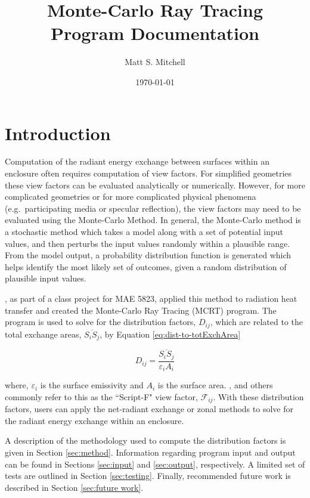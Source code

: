 \documentclass{article}
\title{\textbf{Monte-Carlo Ray Tracing} \\ Program Documentation}
\date{\today}
\author{Matt S. Mitchell}
\begin{document}
\maketitle
\clearpage
\tableofcontents
\clearpage

\section{Introduction}

Computation of the radiant energy exchange between surfaces within an enclosure often requires computation of view factors. For simplified geometries these view factors can be evaluated analytically or numerically. However, for more complicated geometries or for more complicated physical phenomena (e.g.~participating media or specular reflection), the view factors may need to be evaluated using the Monte-Carlo Method. In general, the Monte-Carlo method is a stochastic method which takes a model along with a set of potential input values, and then perturbs the input values randomly within a plausible range. From the model output, a probability distribution function is generated which helps identify the most likely set of outcomes, given a random distribution of plausible input values.

\cite{Nigusse2004}, as part of a class project for MAE 5823, applied this method to radiation heat transfer and created the Monte-Carlo Ray Tracing (MCRT) program. The program is used to solve for the distribution factors, $D_{ij}$, which are related to the total exchange areas, $\overline{S_i S_j}$, by Equation \ref{eq:dist-to-totExchArea}

\begin{equation}
    D_{ij} = \frac{\overline{S_i S_j}}{\varepsilon_i A_i}
    \label{eq:dist-to-totExchArea}
\end{equation}

where, $\varepsilon_i$ is the surface emissivity and $A_i$ is the surface area. \cite{Modest2003}, and others commonly refer to this as the ``Script-F" view factor, $\mathscr{F}_{ij}$. With these distribution factors, users can apply the net-radiant exchange or zonal methods to solve for the radiant energy exchange within an enclosure.

A description of the methodology used to compute the distribution factors is given in Section \ref{sec:method}. Information regarding program input and output can be found in Sections \ref{sec:input} and \ref{sec:output}, respectively. A limited set of tests are outlined in Section \ref{sec:testing}. Finally, recommended future work is described in Section \ref{sec:future work}.
\end{document}
